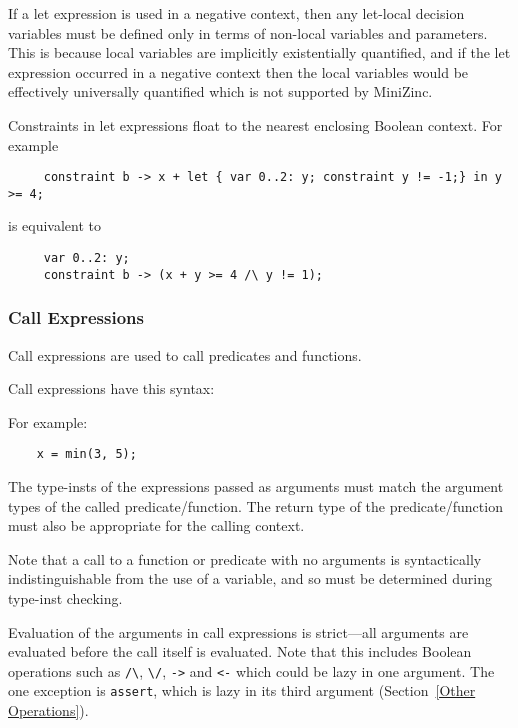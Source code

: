 \documentclass[10pt]{scrartcl}
\begin{document}
If a let expression is used in a negative context, then any let-local
decision variables must be defined only in terms of non-local variables and
parameters.  This is because local variables are implicitly existentially
quantified, and if the let expression occurred in a negative context then
the local variables would be effectively universally quantified which is not
supported by MiniZinc.

Constraints in let expressions float to the nearest enclosing Boolean
context.  For example
\begin{verbatim}
     constraint b -> x + let { var 0..2: y; constraint y != -1;} in y >= 4;
\end{verbatim}
is equivalent to
\begin{verbatim}
     var 0..2: y;
     constraint b -> (x + y >= 4 /\ y != 1);
\end{verbatim} 

\subsubsection{Call Expressions}
Call expressions are used to call predicates and functions.

Call expressions have this syntax:
\begin{productions}
    \RuleCallExpr
\end{productions}
For example:
\begin{verbatim}
    x = min(3, 5);
\end{verbatim}

The type-insts of the expressions passed as arguments must match the
argument types of the called predicate/function.  The return type of the
predicate/function must also be appropriate for the calling context.

Note that a call to a function or predicate with no arguments is
syntactically indistinguishable from the use of a variable, and so must be
determined during type-inst checking.

Evaluation of the arguments in call expressions is strict---all arguments
are evaluated before the call itself is evaluated.  Note that this includes
Boolean operations such as \verb+/\+, \verb+\/+, \texttt{->} and \texttt{<-}
which could be lazy in one argument.  The one exception is \texttt{assert},
which is lazy in its third argument (Section~\ref{Other Operations}).
\end{document}
